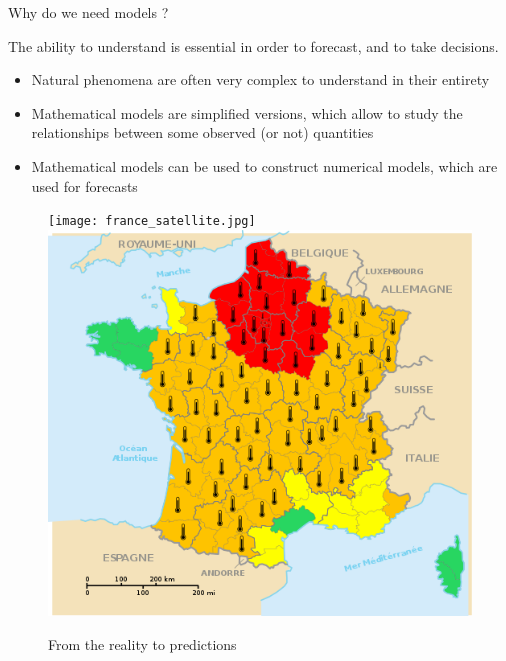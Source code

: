 \documentclass[10pt,aspectratio=169,usepdftitle=false]{beamer}
\begin{document}
\begin{frame}{Why do we need models ?}

  The ability to understand is
  essential in order to forecast, and to take decisions.
  \begin{itemize}
  \item Natural phenomena are often very complex to understand in their entirety
  \item Mathematical models are \alert{simplified} versions, which
    allow to study the relationships between some observed (or not) quantities
  \item Mathematical models can be used to construct numerical
    models, which are used for forecasts
  \end{itemize}
  \begin{center}
    \begin{figure}
  \texttt{[image: france\_satellite.jpg]} \quad 
  \includegraphics[scale=0.20]{heatwave_map.png}%
  \caption{From the reality to predictions}
  \end{figure}
\end{center}
\end{frame}
\end{document}
